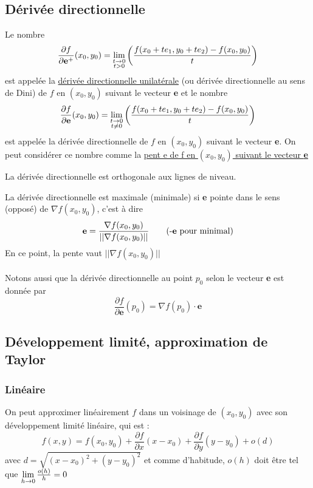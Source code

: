 \documentclass[12pt,a4paper]{article}
\renewcommand{\)}{\right)}
\renewcommand{\(}{\left(}
\begin{document}
\subsection{Dérivée directionnelle}
Le nombre
	\begin{equation*}
		\frac{\partial f}{\partial \textbf{e}^+}(x_0,y_0) = \lim\limits_{\substack{t\to 0 \\ t> 0}}\left(\frac{f(x_0+te_1,y_0+te_2) - f(x_0,y_0)}{t}\right)
	\end{equation*}
	est appelée la  \uline{dérivée directionnelle unilatérale} (ou dérivée directionnelle au sens de Dini) de $f$ en $(x_0,y_0)$ suivant le vecteur \textbf{e} et le nombre
	\begin{equation*}
		\frac{\partial f}{\partial \textbf{e}}(x_0,y_0) = \lim\limits_{\substack{t\to 0 \\ t\neq 0}}\left(\frac{f(x_0+te_1,y_0+te_2) - f(x_0,y_0)}{t}\right)
	\end{equation*}
	est appelée la dérivée directionnelle de $f$ en $(x_0,y_0)$ suivant le vecteur \textbf{e}. On peut considérer ce nombre comme la \uline{pent	e de f en $(x_0,y_0)$ suivant le vecteur \textbf{e}}

La dérivée directionnelle est orthogonale aux lignes de niveau.

La dérivée directionnelle est maximale (minimale) si \textbf{e} pointe dans le sens (opposé) de $\nabla f(x_0,y_0)$, c'est à dire 
\begin{equation*}
	\textbf{e} = \frac{\nabla f(x_0,y_0)}{||\nabla f(x_0,y_0)||} \qquad\text{(-\textbf{e} pour minimal)}
\end{equation*}
En ce point, la pente vaut $||\nabla f(x_0,y_0)||$\\
\\
Notons aussi que la dérivée directionnelle au point $p_0$ selon le vecteur \textbf{e} est donnée par \[\frac{\partial f}{\partial \textbf{e}}(p_0) = \nabla f(p_0)\cdot \textbf{e}\]

\subsection[Développement limité / Taylor]{Développement limité, approximation de Taylor}
\subsubsection{Linéaire}
On peut approximer linéairement $f$ dans un voisinage de $(x_0,y_0)$ avec son développement limité linéaire, qui est :
\begin{equation*}
f(x,y) = f(x_0,y_0) + \frac{\partial f}{\partial x}(x-x_0) + \frac{\partial f}{\partial y}(y-y_0) + o(d)
\end{equation*}
avec $d = \sqrt{(x-x_0)^2 + (y-y_0)^2}$	et comme d'habitude, $o(h)$ doit être tel que $\lim\limits_{h\to 0} \frac{o(h)}{h} = 0$
\end{document}
